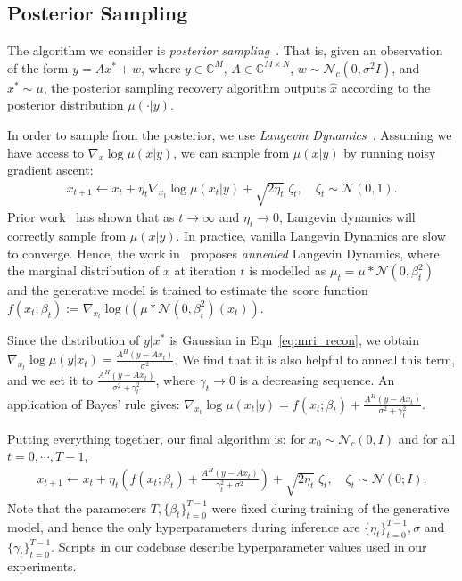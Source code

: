 \documentclass{article}
\newcommand{\wh}{\widehat}
\newcommand{\C}{\mathbb{C}}
\newcommand{\xhat}{\wh{x}}
\newcommand{\cN}{\mathcal N}
\begin{document}
\subsection{Posterior Sampling}

The algorithm we consider is \emph{posterior
sampling}~\cite{jalal2021instance}.  That is, given an observation of
the form $y = Ax^* + w$, where $y \in \C^M$, $A \in \C^{M \times N}$,
$w \sim \cN_c(0,\sigma^2 I)$, and $x^* \sim \mu$, the posterior
sampling recovery algorithm outputs $\xhat$ according to the posterior
distribution $\mu(\cdot | y)$. 

In order to sample from the posterior, we use \emph{Langevin
Dynamics}~\cite{bakry1985diffusions}. Assuming we have access to
$\nabla_x \log \mu(x|y)$, we can sample from $\mu(x|y)$ by running
noisy gradient ascent:
\begin{align}
  x_{t+1} \leftarrow x_t + \eta_t \nabla_{x_t} \log \mu(x_t |
  y) + \sqrt{2 \eta_t} \; \zeta_t, \quad \zeta_t \sim \cN(0,1).
  \label{eqn:langevin}
\end{align}
Prior work~\cite{bakry1985diffusions} has shown that as $t\to \infty$
and $\eta_t \to 0$, Langevin dynamics will correctly sample from
$\mu(x|y)$.  In practice, vanilla Langevin Dynamics are slow to
converge. Hence, the work in~\cite{song2019generative} proposes
\emph{annealed} Langevin Dynamics, where the marginal distribution of
$x$ at iteration $t$ is modelled as $\mu_t = \mu * \cN(0, \beta_t^2)$
and the generative model is trained to estimate the score function
$f(x_t; \beta_t) := \nabla_{x_t} \log ((\mu * \cN(0,\beta_t^2)(x_t))$.

Since the distribution of $y|x^*$ is Gaussian in
Eqn~\eqref{eq:mri_recon}, we obtain $\nabla_{x_t}\log \mu(y | x_t) =
\frac{A^H (y- A x_t) }{\sigma^2}$.  We find that it is also helpful to
anneal this term, and we set it to $\frac{A^H (y - Ax_t)}{\sigma^2 +
\gamma_t^2}$, where $\gamma_t\to 0$ is a decreasing sequence. An
application of Bayes' rule gives: $\nabla_{x_t} \log \mu(x_t | y) =
f(x_t; \beta_t) + \frac{A^H (y - Ax_t)}{\sigma^2 + \gamma_t^2}$.

Putting everything together, our final algorithm is: for $x_0 \sim
\cN_c(0,I)$ and for all $t=0, \cdots, T-1$, 
\begin{align}
  x_{t+1} \leftarrow x_t + \eta_t \left(f(x_t; \beta_t) + \frac{A^H (y - A
  x_t)}{\gamma^2_t + \sigma^2}\right) + \sqrt{2 \eta_t} \; \zeta_t,
	\quad \zeta_t
  \sim \cN(0; I).
  \label{eqn:annealed-langevin}
\end{align}
Note that the parameters $T, \{ \beta_t\}_{t=0}^{T-1}$ were fixed
during training of the generative model, and hence the only
hyperparameters during inference are $\{\eta_t\}_{t=0}^{T-1}, \sigma$ and
$\{\gamma_t\}_{t=0}^{T-1}$. Scripts in our codebase
describe hyperparameter values used in our experiments.
\end{document}

